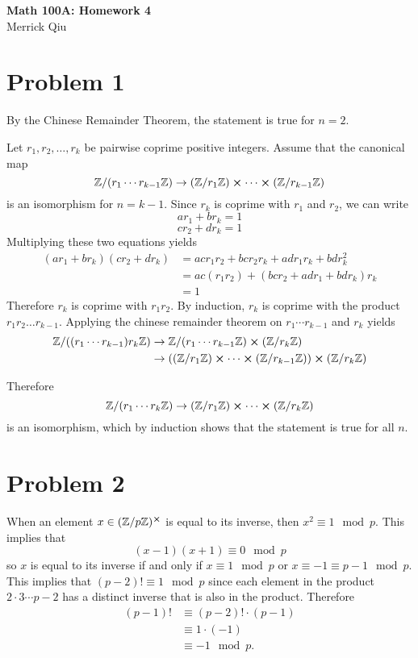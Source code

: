 \documentclass{article}
\begin{document}
\begin{center}
	\huge{\bf Math 100A: Homework 4} \\
	Merrick Qiu
\end{center}

\section*{Problem 1}
By the Chinese Remainder Theorem,
the statement is true for $n=2$.

Let $r_1,r_2,\dots, r_k$ be pairwise coprime positive integers.
Assume that the canonical map 
\[
	\mathbb{Z}/(r_1\cdots r_{k-1}\mathbb{Z}) \rightarrow (\mathbb{Z}/r_1\mathbb{Z})\cross\cdots\cross(\mathbb{Z}/r_{k-1}\mathbb{Z})
\]
is an isomorphism for $n=k-1$.
Since $r_k$ is coprime with $r_1$ and $r_2$,
we can write 
\[
	ar_1 + br_k = 1
\]
\[
	cr_2 + dr_k = 1
\]
Multiplying these two equations yields
\begin{align*}
	(ar_1 + br_k)(cr_2 + dr_k) &= acr_1r_2 + bcr_2r_k + adr_1r_k + bd r_k^2 \\
	&= ac(r_1r_2) + (bcr_2 + adr_1 + bd r_k)r_k \\
	&= 1
\end{align*}
Therefore $r_k$ is coprime with $r_1r_2$.
By induction, $r_k$ is coprime with the product $r_1r_2\dots r_{k-1}$.
Applying the chinese remainder theorem on $r_1\cdots r_{k-1}$ and $r_k$ yields 
\begin{align*}
	\mathbb{Z}/((r_1\cdots r_{k-1})r_k\mathbb{Z}) &\rightarrow 
	\mathbb{Z}/(r_1\cdots r_{k-1}\mathbb{Z}) \cross (\mathbb{Z}/r_k\mathbb{Z})  \\ &\rightarrow
	((\mathbb{Z}/r_1\mathbb{Z})\cross\cdots\cross(\mathbb{Z}/r_{k-1}\mathbb{Z})) \cross (\mathbb{Z}/r_k\mathbb{Z})
\end{align*}

Therefore
\[
	\mathbb{Z}/(r_1\cdots r_{k}\mathbb{Z}) \rightarrow (\mathbb{Z}/r_1\mathbb{Z})\cross\cdots\cross(\mathbb{Z}/r_{k}\mathbb{Z})
\]
is an isomorphism, 
which by induction shows that the statement is true for all $n$.

\newpage
\section*{Problem 2}

When an element $x \in (\mathbb{Z}/p\mathbb{Z})^{\cross}$
is equal to its inverse, then $x^2 \equiv 1 \mod p$.
This implies that 
\[
	(x-1)(x+1) \equiv 0 \mod p
\]
so $x$ is equal to its inverse if and only if 
$x \equiv 1 \mod p$ or $x \equiv -1 \equiv p-1 \mod p$.
This implies that $(p-2)! \equiv 1 \mod p$ since each element in the 
product $2\cdot 3 \dotsm p-2$ has a distinct inverse
that is also in the product.
Therefore 
\begin{align*}
	(p-1)! &\equiv (p-2)!\cdot(p-1) \\
	&\equiv 1\cdot(-1) \\
	&\equiv -1 \mod p.
\end{align*}
\end{document}
